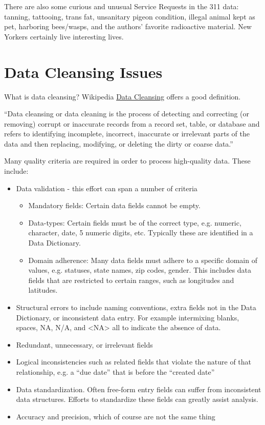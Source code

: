\documentclass[12pt, titlepage]{article}
\begin{document}
There are also some curious and unusual Service Requests in the 311 data: 
tanning, tattooing, trans fat, unsanitary pigeon condition, illegal animal 
kept as pet, harboring bees/wasps, and the authors' favorite
radioactive material. New Yorkers certainly live interesting lives. 



\section{Data Cleansing Issues} \label{sec:issues}

What is data cleansing?  Wikipedia 
\href{https://en.wikipedia.org/wiki/Data_cleansing}{Data Cleansing} offers a good definition. 

``Data cleansing or data cleaning is the process of detecting and 
correcting (or removing) corrupt or inaccurate records from a record set, 
table, or database and refers to identifying incomplete, incorrect, 
inaccurate or irrelevant parts of the data 
and then replacing, modifying, or deleting the dirty or coarse data.''

Many quality criteria are required in order to process high-quality data. 
These include:

\begin{itemize}
	\item Data validation - this effort can span a number of criteria
	\begin{itemize}
		\item Mandatory fields: Certain data fields cannot be empty.
		\item Data-types: Certain fields must be of the correct type, e.g. numeric, 
		character, date, 5 numeric digits, etc. Typically these are identified 
		in a Data Dictionary.
		\item Domain adherence:  Many data fields must adhere to a specific 
		domain of values, e.g. statuses, state names, zip codes, gender. 
		This includes data fields that are restricted to certain ranges, 
		such as longitudes and latitudes.
	\end{itemize}   
	\item Structural errors to include naming conventions, 
	extra fields not in the Data Dictionary, or inconsistent data entry.
	For example intermixing blanks, spaces, NA, N/A, and \textless{}NA\textgreater{} 
	all to indicate the absence of data.
	\item Redundant, unnecessary, or irrelevant fields
	\item Logical inconsistencies such as related fields that violate the 
	nature of that relationship, e.g. a ``due date'' that is before the ``created date''
	\item Data standardization. Often free-form entry fields can suffer 
	from inconsistent data structures. Efforts to standardize these fields 
	can greatly assist analysis.
	\item Accuracy and precision, which of course are not the same thing 
\end{itemize}
\end{document}
